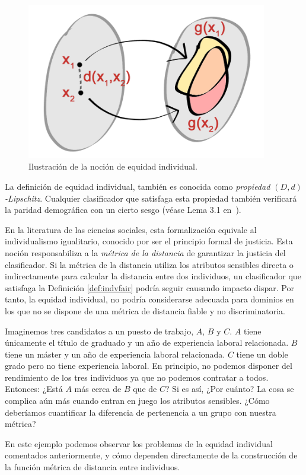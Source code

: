 \documentclass[oneside,openright,titlepage,numbers=noenddot,openany,headinclude,footinclude=true,
cleardoublepage=empty,abstractoff,BCOR=5mm,paper=a4,fontsize=12pt,main=spanish]{scrreprt}
\begin{document}
\begin{figure}[h]
	\centering
	\includegraphics[width=10.5cm]{individual_fair.jpg}
	\caption{Ilustración de la noción de equidad individual.}
    \label{fig:individual_fairness}
\end{figure}

La definición de equidad individual, también es conocida como \textit{propiedad $(D,d)$-Lipschitz}. Cualquier clasificador que satisfaga esta propiedad también verificará la paridad demográfica con un cierto sesgo (véase Lema 3.1 en~\cite{detect2012}).

En la literatura de las ciencias sociales, esta formalización
equivale al individualismo igualitario, conocido por ser el principio formal de justicia. Esta noción responsabiliza a la \textit{métrica de la distancia} de garantizar la justicia del clasificador. Si la métrica de la distancia utiliza los atributos sensibles directa o indirectamente para calcular la distancia entre dos individuos, un clasificador que satisfaga la Definición \ref{def:indvfair} podría seguir causando impacto dispar. Por tanto, la equidad individual, no podría considerarse adecuada para dominios en los que no se dispone de una métrica de distancia fiable y no discriminatoria.

\begin{example}
Imaginemos tres candidatos a un puesto de trabajo, $A$, $B$ y $C$. $A$ tiene únicamente el título de graduado y un año de experiencia laboral relacionada. $B$ tiene un máster y un año de experiencia laboral relacionada. $C$ tiene un doble grado pero no tiene experiencia laboral. En principio, no podemos disponer del rendimiento de los tres individuos ya que no podemos contratar a todos. Entonces: ¿Está $A$ más cerca de $B$ que de $C$? Si es así, ¿Por cuánto? La cosa se complica aún más cuando entran en juego los atributos sensibles. ¿Cómo deberíamos cuantificar la diferencia de pertenencia a un grupo con nuestra métrica?

En este ejemplo podemos observar los problemas de la equidad individual comentados anteriormente, y cómo dependen directamente de la construcción de la función métrica de distancia entre individuos.
\end{example}
\end{document}
